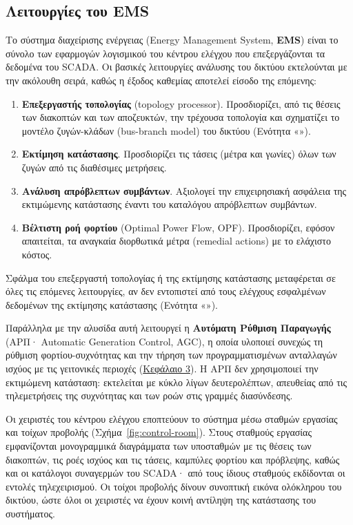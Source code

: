 \subsection{Λειτουργίες του EMS}

Το σύστημα διαχείρισης ενέργειας (Energy Management System, \textbf{EMS}) είναι το σύνολο των
εφαρμογών λογισμικού του κέντρου ελέγχου που επεξεργάζονται τα δεδομένα του SCADA. Οι βασικές λειτουργίες ανάλυσης του δικτύου εκτελούνται με την
ακόλουθη σειρά, καθώς η έξοδος καθεμίας αποτελεί είσοδο της επόμενης:

\begin{enumerate}
\item \textbf{Επεξεργαστής τοπολογίας} (topology processor). Προσδιορίζει, από τις θέσεις
      των διακοπτών και των αποζευκτών, την τρέχουσα τοπολογία και σχηματίζει το μοντέλο
      ζυγών-κλάδων (bus-branch model) του δικτύου (Ενότητα «»).
\item \textbf{Εκτίμηση κατάστασης}. Προσδιορίζει τις τάσεις (μέτρα και γωνίες) όλων των
      ζυγών από τις διαθέσιμες μετρήσεις.
\item \textbf{Ανάλυση απρόβλεπτων συμβάντων}. Αξιολογεί την επιχειρησιακή ασφάλεια της
      εκτιμώμενης κατάστασης έναντι του καταλόγου απρόβλεπτων συμβάντων.
\item \textbf{Βέλτιστη ροή φορτίου} (Optimal Power Flow, OPF). Προσδιορίζει, εφόσον
      απαιτείται, τα αναγκαία διορθωτικά μέτρα (remedial actions) με το ελάχιστο κόστος.
\end{enumerate}

Σφάλμα του επεξεργαστή τοπολογίας ή της εκτίμησης κατάστασης μεταφέρεται σε όλες τις
επόμενες λειτουργίες, αν δεν εντοπιστεί από τους ελέγχους εσφαλμένων δεδομένων της εκτίμησης
κατάστασης (Ενότητα «»).

Παράλληλα με την αλυσίδα αυτή λειτουργεί η \textbf{Αυτόματη Ρύθμιση Παραγωγής} (ΑΡΠ· Automatic
Generation Control, AGC), η οποία υλοποιεί συνεχώς τη ρύθμιση φορτίου-συχνότητας και την
τήρηση των προγραμματισμένων ανταλλαγών ισχύος με τις γειτονικές περιοχές
(\hyperref[kef-03-theoria]{Κεφάλαιο 3}). Η ΑΡΠ δεν χρησιμοποιεί την εκτιμώμενη κατάσταση:
εκτελείται με κύκλο λίγων δευτερολέπτων, απευθείας από τις τηλεμετρήσεις της συχνότητας και
των ροών στις γραμμές διασύνδεσης.

Οι χειριστές του κέντρου ελέγχου εποπτεύουν το σύστημα μέσω σταθμών εργασίας και τοίχων
προβολής (Σχήμα~\ref{fig:control-room}). Στους σταθμούς εργασίας εμφανίζονται μονογραμμικά
διαγράμματα των υποσταθμών με τις θέσεις των διακοπτών, τις ροές ισχύος και τις τάσεις,
καμπύλες φορτίου και πρόβλεψης, καθώς και οι κατάλογοι συναγερμών του SCADA· από τους ίδιους
σταθμούς εκδίδονται οι εντολές τηλεχειρισμού. Οι τοίχοι προβολής δίνουν συνοπτική εικόνα
ολόκληρου του δικτύου, ώστε όλοι οι χειριστές να έχουν κοινή αντίληψη της κατάστασης του
συστήματος.

